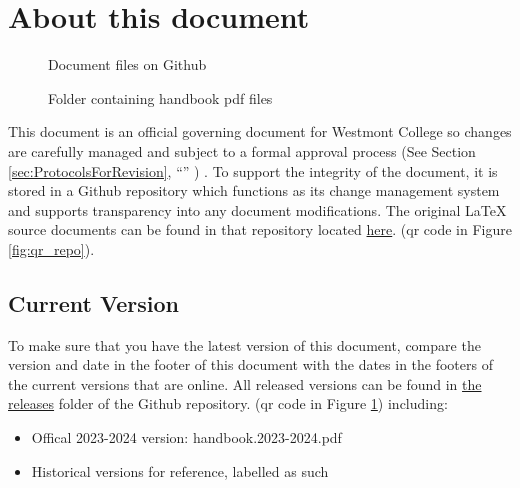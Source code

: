 \section{About this document}
	\label{sec:AboutThisDocument}

	\begin{figure}
		\centering
		\vspace{-30pt}
		\caption{Document files on Github}
		\label{fig:qr_repo}
		\vspace{10pt}
		\caption{Folder containing handbook pdf files}
		\label{fig:qr_releases}
	\end{figure}


	This document is an official governing document for Westmont College so changes are carefully managed and subject to a formal approval process
	(See Section
	\ref{sec:ProtocolsForRevision},
	``''
	) .
	To support the integrity of the document, it is stored in a Github repository which functions as its change management system and supports transparency into any document modifications.
	The original LaTeX source documents can be found in that repository located
	\href{https://github.com/jaron-burdick/WestmontFacultyHandbook}{here}.
	(qr code in Figure \ref{fig:qr_repo}).


	\subsection{Current Version}


		To make sure that you have the latest version of this document, compare the version and date in the
		footer of this document with the dates in the footers of the current versions that are online.
		All released versions can be found in
		\href{https://github.com/jaron-burdick/WestmontFacultyHandbook/tree/main/releases}{the releases} folder of the Github repository.
		(qr code in Figure \ref{fig:qr_releases}) including:
		\begin{itemize}
			\item{Offical 2023-2024 version: handbook.2023-2024.pdf}
			\item{Historical versions for reference, labelled as such}
		\end{itemize}

